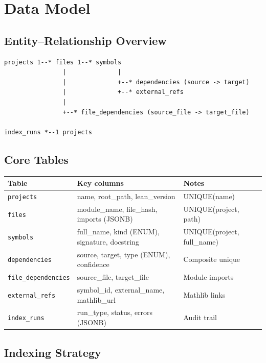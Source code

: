 \chapter{Data Model}

\section{Entity--Relationship Overview}

\begin{lstlisting}[language={}]
projects 1--* files 1--* symbols
                |              |
                |              +--* dependencies (source -> target)
                |              +--* external_refs
                |
                +--* file_dependencies (source_file -> target_file)

index_runs *--1 projects
\end{lstlisting}

\section{Core Tables}

\begin{table}[h]
\centering
\begin{tabular}{@{}lll@{}}
\toprule
\textbf{Table} & \textbf{Key columns} & \textbf{Notes} \\
\midrule
\texttt{projects}          & name, root\_path, lean\_version & UNIQUE(name) \\
\texttt{files}             & module\_name, file\_hash, imports (JSONB) & UNIQUE(project, path) \\
\texttt{symbols}           & full\_name, kind (ENUM), signature, docstring & UNIQUE(project, full\_name) \\
\texttt{dependencies}      & source, target, type (ENUM), confidence & Composite unique \\
\texttt{file\_dependencies} & source\_file, target\_file & Module imports \\
\texttt{external\_refs}    & symbol\_id, external\_name, mathlib\_url & Mathlib links \\
\texttt{index\_runs}       & run\_type, status, errors (JSONB) & Audit trail \\
\bottomrule
\end{tabular}
\end{table}

\section{Indexing Strategy}

